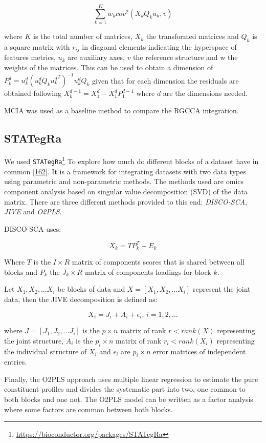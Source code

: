 \documentclass[
  a4paper,
]{book}
\DeclareRobustCommand{\href}[2]{#2\footnote{\url{#1}}}
\begin{document}
\[
\sum_{k=1}^K w_k {cov}^2 (X_k Q_k u_k, v)
\]

where \(K\) is the total number of matrices, \(X_k\) the transformed matrices and \(Q_k\) is a square matrix with \(r_{ij}\) in diagonal elements indicating the hyperspace of features metrics, \(u_k\) are auxiliary axes, \(v\) the reference structure and w the weights of the matrices.
This can be used to obtain a dimension of \(P_k^d=u_k^d(u_k^d Q_k {u_k^d}^T)^{-1} u_k^d Q_k\) given that for each dimension the residuals are obtained following \(X_k^{d-1} = X_1^d- X_1^d P_1^{d-1}\) where \(d\) are the dimensions needed.

MCIA was used as a baseline method to compare the RGCCA integration.

\hypertarget{stategra}{%
\subsection{STATegRa}\label{stategra}}

We used \href{https://bioconductor.org/packages/STATegRa}{\texttt{STATegRa}} To explore how much do different blocks of a dataset have in common {[}\protect\hyperlink{ref-planell2021}{162}{]}.
It is a framework for integrating datasets with two data types using parametric and non-parametric methods.
The methods used are omics component analysis based on singular value decomposition (SVD) of the data matrix.
There are three different methods provided to this end: \emph{DISCO-SCA}, \emph{JIVE} and \emph{O2PLS}.

DISCO-SCA uses:

\[
X_k = TP_k ^ T + E_k
\]

Where \(T\) is the \(I \times R\) matrix of components scores that is shared between all blocks and \(P_k\) the \(J_k \times R\) matrix of components loadings for block \(k\).

Let \(X_1,X_2, \dots X_i\) be blocks of data and \(X=[X_1,X_2, \dots X_i]\) represent the joint data, then the JIVE decomposition is defined as:

\[X_i=J_i+A_i+\epsilon_i \text{, }i = 1,2, \dots\]

where \(J=[J_1,J_2, \dots J_i]\) is the \(p \times n\) matrix of rank \(r<rank(X)\) representing the joint structure, \(A_i\) is the \(p_i\times n\) matrix of rank \(r_i < rank(X_i)\) representing the individual structure of \(X_i\) and \(\epsilon_i\) are \(p_i \times n\) error matrices of independent entries.

Finally, the O2PLS approach uses multiple linear regression to estimate the pure constituent profiles and divides the systematic part into two, one common to both blocks and one not.
The O2PLS model can be written as a factor analysis where some factors are common between both blocks.
\end{document}

